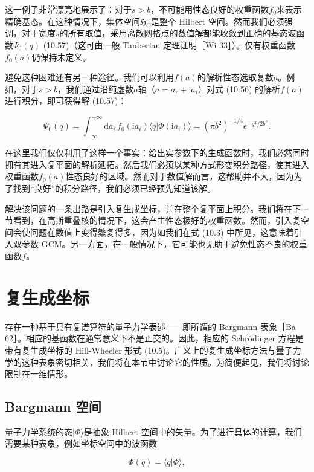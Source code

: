这一例子非常漂亮地展示了：对于$s>b$，不可能用性态良好的权重函数$f_{0}$来表示精确基态。在这种情况下，集体空间$\mathfrak{H}_{C}$是整个
Hilbert 空间。然而我们必须强调，对于宽度$s$的所有取值，采用离散网格点的数值解都能收敛到正确的基态波函数$\Psi_{0}(q)$
(10.57)（这可由一般 Tauberian 定理证明［Wi 33］）。仅有权重函数$f_{0}(a)$仍保持未定义。

避免这种困难还有另一种途径。我们可以利用$f(a)$的解析性态选取复数$a$。例如，对于$s>b$，我们通过沿纯虚数$a$轴（$a=a_{r}+\mathrm{i}a_{i}$）对式
(10.56) 的解析$f(a)$进行积分，即可获得解 (10.57)：

\begin{equation}
\Psi_{0}(q)=\int^{+\infty}_{-\infty}\mathrm{d}a_{i}\,f_{0}(\mathrm{i}a_{i})\langle q|\Phi(\mathrm{i}a_{i})\rangle=(\pi b^{2})^{-1/4}e^{-q^{2}/2b^{2}}.\label{eq:ho_complex_integral_psi0}
\end{equation}

在这里我们仅仅利用了这样一个事实：给出实参数下的生成函数时，我们必然同时拥有其进入复平面的解析延拓。然后我们必须以某种方式形变积分路径，使其进入权重函数$f_{0}(a)$性态良好的区域。然而对于数值解而言，这帮助并不大，因为为了找到“良好”的积分路径，我们必须已经预先知道该解。

解决该问题的一条出路是引入复生成坐标，并在整个复平面上积分。我们将在下一节看到，在高斯重叠核的情况下，这会产生性态极好的权重函数。然而，引入复空间会使问题在数值上变得繁复得多，因为如我们在式
(10.3) 中所见，这意味着引入双参数 GCM。另一方面，在一般情况下，它可能也无助于避免性态不良的权重函数$f$。

\section{复生成坐标}

存在一种基于具有复谱算符的量子力学表述——即所谓的 Bargmann 表象［Ba 62］。相应的基函数在通常意义下不是正交的。因此，相应的
Schrödinger 方程是带有复生成坐标的 Hill-Wheeler 形式 (10.5)。广义上的复生成坐标方法与量子力学的这种表象密切相关，我们将在本节中讨论它的性质。为简便起见，我们将讨论限制在一维情形。

\subsection{Bargmann 空间}

量子力学系统的态$|\Phi\rangle$是抽象 Hilbert 空间中的矢量。为了进行具体的计算，我们需要某种表象，例如坐标空间中的波函数

\begin{equation}
\Phi(q)=\langle q|\Phi\rangle,\label{eq:10.60}
\end{equation}

